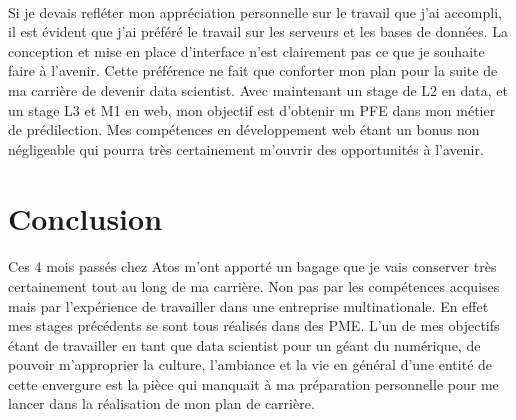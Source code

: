 \documentclass[12pt]{article}
\begin{document}
\begin {sloppypar}
\paragraph{}
Si je devais refléter mon appréciation personnelle sur le travail que j'ai accompli, il est évident que j'ai préféré
le travail sur les serveurs et les bases de données. La conception et mise en place d'interface n'est clairement pas ce 
que je souhaite faire à l'avenir. Cette préférence ne fait que conforter mon plan pour la suite de ma carrière 
de devenir data scientist. Avec maintenant un stage de L2 en data, et un stage L3 et M1 en web, mon objectif 
est d'obtenir un PFE dans mon métier de prédilection. Mes compétences en développement web étant un bonus
non négligeable qui pourra très certainement m'ouvrir des opportunités à l'avenir.

\section{Conclusion}
\paragraph{}
Ces 4 mois passés chez Atos m'ont apporté un bagage que je vais conserver très certainement tout 
au long de ma carrière. Non pas par les compétences acquises mais par l'expérience de travailler 
dans une entreprise multinationale. En effet mes stages précédents se sont tous réalisés dans des PME. 
L'un de mes objectifs étant de travailler en tant que data scientist pour un géant du numérique, 
de pouvoir m'approprier la culture, l'ambiance et la vie en général d'une entité de cette envergure
est la pièce qui manquait à ma préparation personnelle pour me lancer dans la réalisation de mon plan de carrière. 

\newpage

\end{sloppypar}
\end{document}

